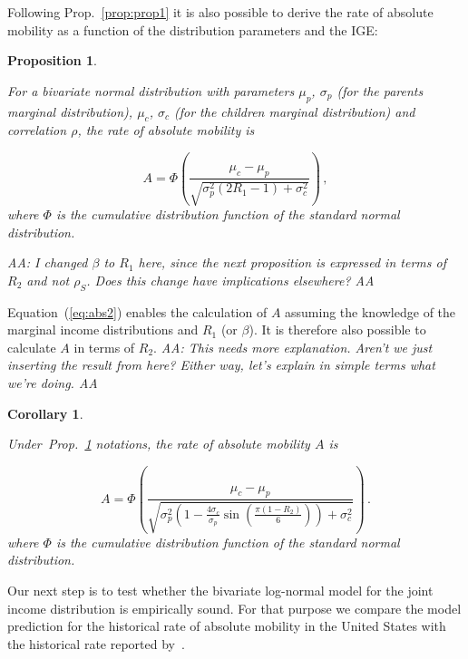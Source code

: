 \documentclass[12pt,a4paper]{article}
\newtheorem{corollary}[theorem]{Corollary}
\newtheorem{proposition}{Proposition}
\newcommand{\red}[1]{{\color{red} #1}}
\newcommand{\elabel}[1]{\label{eq:#1}}
\newcommand{\Eref}[1]{Equation~(\ref{eq:#1})}
\newcommand{\pref}[1]{Prop.~\ref{prop:#1}}
\newcommand{\clabel}[1]{\label{coro:#1}}
\newcommand{\AAA}[1]{\red{{\it AA: #1 AA}}}
\newcommand{\be}{\begin{equation}}
\newcommand{\ee}{\end{equation}}
\numberwithin{equation}{section}
\begin{document}
Following \pref{prop1} it is also possible to derive the rate of absolute mobility as a function of the distribution parameters and the IGE:

\begin{proposition}
\label{prop:prop2}

For a bivariate normal distribution with parameters $\mu_p$, $\sigma_p$ (for the parents marginal distribution), $\mu_c$, $\sigma_c$ (for the children marginal distribution) and correlation $\rho$, the rate of absolute mobility is

\be
A = \Phi\left(\frac{\mu_c - \mu_p}{\sqrt{\sigma_p^2\left(2R_1-1\right) + \sigma_c^2}}\right) \,,
\elabel{abs2}
\ee
where $\Phi$ is the cumulative distribution function of the standard normal distribution.
\end{proposition}
\AAA{I changed $\beta$ to $R_1$ here, since the next proposition is expressed in terms of $R_2$ and not $\rho_S$. Does this change have implications elsewhere?}

\Eref{abs2} enables the calculation of $A$ assuming the knowledge of the marginal income distributions and $R_1$ (or $\beta$). It is therefore also possible to calculate $A$ in terms of $R_2$. \AAA{This needs more explanation. Aren't we just inserting the result from \citep{trivedi2007copula} here? Either way, let's explain in simple terms what we're doing.}

\begin{corollary}
\clabel{coro1}

Under~\pref{prop2} notations, the rate of absolute mobility $A$ is

\be
A = \Phi\left(\frac{\mu_c - \mu_p}{\sqrt{\sigma_p^2\left(1 - \frac{4\sigma_c}{\sigma_p}\sin{\left(\frac{\pi\left(1-R_2\right)}{6}\right)}\right) + \sigma_c^2}}\right) \,.
\elabel{abs3}
\ee
where $\Phi$ is the cumulative distribution function of the standard normal distribution.
\end{corollary}

Our next step is to test whether the bivariate log-normal model for the joint income distribution is empirically sound. For that purpose we compare the model prediction for the historical rate of absolute mobility in the United States with the historical rate reported by~\citet{chetty2017fading}.
\end{document}
